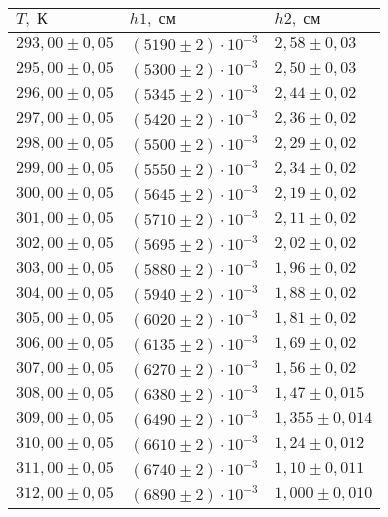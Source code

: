 \begin{tabular}{|l|l|l|}
\hline
$T,\;\text{К}$ & $h1,\;\text{см}$ & $h2,\;\text{см}$\\\hline
$293{,}00 \pm 0{,}05$ & $\left(5190 \pm 2\right)\cdot 10^{-3}$ & $2{,}58 \pm 0{,}03$\\\hline
$295{,}00 \pm 0{,}05$ & $\left(5300 \pm 2\right)\cdot 10^{-3}$ & $2{,}50 \pm 0{,}03$\\\hline
$296{,}00 \pm 0{,}05$ & $\left(5345 \pm 2\right)\cdot 10^{-3}$ & $2{,}44 \pm 0{,}02$\\\hline
$297{,}00 \pm 0{,}05$ & $\left(5420 \pm 2\right)\cdot 10^{-3}$ & $2{,}36 \pm 0{,}02$\\\hline
$298{,}00 \pm 0{,}05$ & $\left(5500 \pm 2\right)\cdot 10^{-3}$ & $2{,}29 \pm 0{,}02$\\\hline
$299{,}00 \pm 0{,}05$ & $\left(5550 \pm 2\right)\cdot 10^{-3}$ & $2{,}34 \pm 0{,}02$\\\hline
$300{,}00 \pm 0{,}05$ & $\left(5645 \pm 2\right)\cdot 10^{-3}$ & $2{,}19 \pm 0{,}02$\\\hline
$301{,}00 \pm 0{,}05$ & $\left(5710 \pm 2\right)\cdot 10^{-3}$ & $2{,}11 \pm 0{,}02$\\\hline
$302{,}00 \pm 0{,}05$ & $\left(5695 \pm 2\right)\cdot 10^{-3}$ & $2{,}02 \pm 0{,}02$\\\hline
$303{,}00 \pm 0{,}05$ & $\left(5880 \pm 2\right)\cdot 10^{-3}$ & $1{,}96 \pm 0{,}02$\\\hline
$304{,}00 \pm 0{,}05$ & $\left(5940 \pm 2\right)\cdot 10^{-3}$ & $1{,}88 \pm 0{,}02$\\\hline
$305{,}00 \pm 0{,}05$ & $\left(6020 \pm 2\right)\cdot 10^{-3}$ & $1{,}81 \pm 0{,}02$\\\hline
$306{,}00 \pm 0{,}05$ & $\left(6135 \pm 2\right)\cdot 10^{-3}$ & $1{,}69 \pm 0{,}02$\\\hline
$307{,}00 \pm 0{,}05$ & $\left(6270 \pm 2\right)\cdot 10^{-3}$ & $1{,}56 \pm 0{,}02$\\\hline
$308{,}00 \pm 0{,}05$ & $\left(6380 \pm 2\right)\cdot 10^{-3}$ & $1{,}47 \pm 0{,}015$\\\hline
$309{,}00 \pm 0{,}05$ & $\left(6490 \pm 2\right)\cdot 10^{-3}$ & $1{,}355 \pm 0{,}014$\\\hline
$310{,}00 \pm 0{,}05$ & $\left(6610 \pm 2\right)\cdot 10^{-3}$ & $1{,}24 \pm 0{,}012$\\\hline
$311{,}00 \pm 0{,}05$ & $\left(6740 \pm 2\right)\cdot 10^{-3}$ & $1{,}10 \pm 0{,}011$\\\hline
$312{,}00 \pm 0{,}05$ & $\left(6890 \pm 2\right)\cdot 10^{-3}$ & $1{,}000 \pm 0{,}010$\\\hline

\end{tabular}
